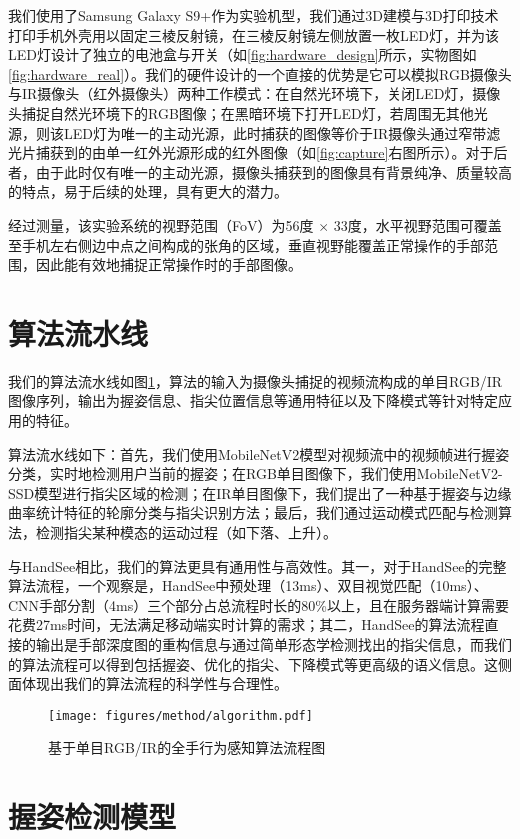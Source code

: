 我们使用了Samsung Galaxy S9+作为实验机型，我们通过3D建模与3D打印技术打印手机外壳用以固定三棱反射镜，在三棱反射镜左侧放置一枚LED灯，并为该LED灯设计了独立的电池盒与开关（如\ref{fig:hardware_design}所示，实物图如\ref{fig:hardware_real}）。我们的硬件设计的一个直接的优势是它可以模拟RGB摄像头与IR摄像头（红外摄像头）两种工作模式：在自然光环境下，关闭LED灯，摄像头捕捉自然光环境下的RGB图像；在黑暗环境下打开LED灯，若周围无其他光源，则该LED灯为唯一的主动光源，此时捕获的图像等价于IR摄像头通过窄带滤光片捕获到的由单一红外光源形成的红外图像（如\ref{fig:capture}右图所示）。对于后者，由于此时仅有唯一的主动光源，摄像头捕获到的图像具有背景纯净、质量较高的特点，易于后续的处理，具有更大的潜力。

经过测量，该实验系统的视野范围（FoV）为56度 $\times$ 33度，水平视野范围可覆盖至手机左右侧边中点之间构成的张角的区域，垂直视野能覆盖正常操作的手部范围，因此能有效地捕捉正常操作时的手部图像。

\section{算法流水线}

我们的算法流水线如图\ref{fig:algorithm}，算法的输入为摄像头捕捉的视频流构成的单目RGB/IR图像序列，输出为握姿信息、指尖位置信息等通用特征以及下降模式等针对特定应用的特征。

算法流水线如下：首先，我们使用MobileNetV2模型对视频流中的视频帧进行握姿分类，实时地检测用户当前的握姿；在RGB单目图像下，我们使用MobileNetV2-SSD模型进行指尖区域的检测；在IR单目图像下，我们提出了一种基于握姿与边缘曲率统计特征的轮廓分类与指尖识别方法；最后，我们通过运动模式匹配与检测算法，检测指尖某种模态的运动过程（如下落、上升）。

与HandSee相比，我们的算法更具有通用性与高效性。其一，对于HandSee的完整算法流程，一个观察是，HandSee中预处理（13ms）、双目视觉匹配（10ms）、CNN手部分割（4ms）三个部分占总流程时长的80\%以上，且在服务器端计算需要花费27ms时间，无法满足移动端实时计算的需求；其二，HandSee的算法流程直接的输出是手部深度图的重构信息与通过简单形态学检测找出的指尖信息，而我们的算法流程可以得到包括握姿、优化的指尖、下降模式等更高级的语义信息。这侧面体现出我们的算法流程的科学性与合理性。

\begin{figure}
\centering
\texttt{[image: figures/method/algorithm.pdf]}
\caption{基于单目RGB/IR的全手行为感知算法流程图}
\label{fig:algorithm}
\end{figure}

\section{握姿检测模型}
\label{cha:grip}

